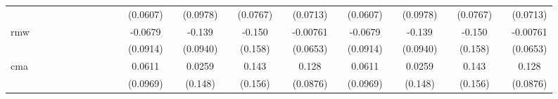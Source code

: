 \begin{table}[htbp]
\begin{tabular}{l*{24}{c}}
                    &                     &                     &                     &                     &                     &                     &                     &                     &                     &    (0.0607)         &                     &    (0.0978)         &                     &    (0.0767)         &                     &    (0.0713)         &                     &    (0.0607)         &                     &    (0.0978)         &                     &    (0.0767)         &                     &    (0.0713)         \\
[1em]
rmw                 &                     &                     &                     &                     &                     &                     &                     &                     &                     &     -0.0679         &                     &      -0.139         &                     &      -0.150         &                     &    -0.00761         &                     &     -0.0679         &                     &      -0.139         &                     &      -0.150         &                     &    -0.00761         \\
                    &                     &                     &                     &                     &                     &                     &                     &                     &                     &    (0.0914)         &                     &    (0.0940)         &                     &     (0.158)         &                     &    (0.0653)         &                     &    (0.0914)         &                     &    (0.0940)         &                     &     (0.158)         &                     &    (0.0653)         \\
[1em]
cma                 &                     &                     &                     &                     &                     &                     &                     &                     &                     &      0.0611         &                     &      0.0259         &                     &       0.143         &                     &       0.128         &                     &      0.0611         &                     &      0.0259         &                     &       0.143         &                     &       0.128         \\
                    &                     &                     &                     &                     &                     &                     &                     &                     &                     &    (0.0969)         &                     &     (0.148)         &                     &     (0.156)         &                     &    (0.0876)         &                     &    (0.0969)         &                     &     (0.148)         &                     &     (0.156)         &                     &    (0.0876)         \\

\end{tabular}
\end{table}
